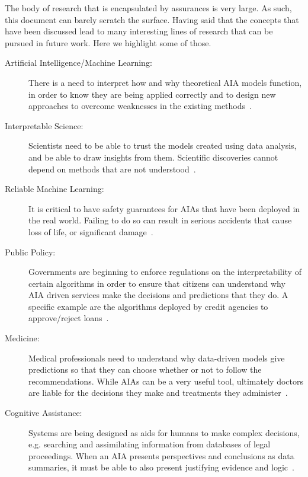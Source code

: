The body of research that is encapsulated by assurances is very large. As such, this document can barely scratch the surface. Having said that the concepts that have been discussed lead to many interesting lines of research that can be pursued in future work. Here we highlight some of those.

    \begin{description}
        \item [Artificial Intelligence/Machine Learning:] There is a need to interpret how and why theoretical AIA models function, in order to know they are being applied correctly and to design new approaches to overcome weaknesses in the existing methods~\cite{Garcia2015-rs,Otte2013-oo}.    
        \item [Interpretable Science:] Scientists need to be able to trust the models created using data analysis, and be able to draw insights from them. Scientific discoveries cannot depend on methods that are not understood~\cite{Faghmous2014-og}.
        \item [Reliable Machine Learning:] It is critical to have safety guarantees for AIAs that have been deployed in the real world. Failing to do so can result in serious accidents that cause loss of life, or significant damage~\cite{Sugiyama2013-ci,Amodei2016-xi}.       
        \item [Public Policy:] Governments are beginning to enforce regulations on the interpretability of certain algorithms in order to ensure that citizens can understand why AIA driven services make the decisions and predictions that they do. A specific example are the algorithms deployed by credit agencies to approve/reject loans~\cite{Wagner2016-ck}.
        \item [Medicine:] Medical professionals need to understand why data-driven models give predictions so that they can choose whether or not to follow the recommendations. While AIAs can be a very useful tool, ultimately doctors are liable for the decisions they make and treatments they administer~\cite{Jovanovic2016-gw}.
        \item [Cognitive Assistance:] Systems are being designed as aids for humans to make complex decisions, e.g. searching and assimilating information from databases of legal proceedings. When an AIA presents perspectives and conclusions as data summaries, it must be able to also present justifying evidence and logic~\cite{Gutfreund2016-xe}.
    \end{description}


